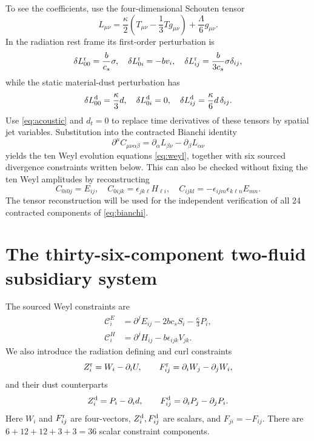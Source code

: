 \documentclass[10pt,a4paper]{article}
\newcommand{\cE}{\mathcal C^{E}}
\newcommand{\cH}{\mathcal C^{H}}
\newcommand{\kgr}{\kappa}
\begin{document}
To see the coefficients, use the four-dimensional Schouten tensor
\begin{equation}\label{eq:schouten}
L_{\mu\nu}=\frac{\kgr}{2}\left(T_{\mu\nu}-\frac13Tg_{\mu\nu}\right)+\frac\Lambda6 g_{\mu\nu}.
\end{equation}
In the radiation rest frame its first-order perturbation is
\begin{equation}\label{eq:rads}
\delta L^{\rm r}_{00}=\frac b{c_s}\sigma,\quad
\delta L^{\rm r}_{0i}=-bv_i,\quad
\delta L^{\rm r}_{ij}=\frac b{3c_s}\sigma\delta_{ij},
\end{equation}
while the static material-dust perturbation has
\begin{equation}\label{eq:dusts}
\delta L^{\rm d}_{00}=\frac{\kgr}3d,\quad
\delta L^{\rm d}_{0i}=0,\quad
\delta L^{\rm d}_{ij}=\frac{\kgr}6d\,\delta_{ij}.
\end{equation}
Use \eqref{eq:acoustic} and $d_t=0$ to replace time derivatives of these tensors by spatial jet variables. Substitution into the contracted Bianchi identity
\begin{equation}\label{eq:bianchi}
\partial^\mu C_{\mu\nu\alpha\beta}=
\partial_\alpha L_{\beta\nu}-\partial_\beta L_{\alpha\nu}
\end{equation}
yields the ten Weyl evolution equations \eqref{eq:weyl}, together with six sourced divergence constraints written below. This can also be checked without fixing the ten Weyl amplitudes by reconstructing
\begin{equation}\label{eq:reconstruct}
C_{0i0j}=E_{ij},\quad
C_{0ijk}=\epsilon_{jk\ell}H_{\ell i},\quad
C_{ijkl}=-\epsilon_{ijm}\epsilon_{k\ell n}E_{mn}.
\end{equation}
The tensor reconstruction will be used for the independent verification of all 24 contracted components of \eqref{eq:bianchi}.

\section{The thirty-six-component two-fluid subsidiary system}
The sourced Weyl constraints are
\begin{align}\label{eq:weylconstraints}
\cE_i&=\partial^jE_{ij}-2bc_s S_i-\frac{\kgr}{3}P_i,\\
\cH_i&=\partial^jH_{ij}-b\epsilon_{ijk}V_{jk}.
\end{align}
We also introduce the radiation defining and curl constraints
\begin{equation}\label{eq:radconstraints}
Z^{\rm r}_i=W_i-\partial_iU,\qquad
F^{\rm r}_{ij}=\partial_i W_j-\partial_j W_i,
\end{equation}
and their dust counterparts
\begin{equation}\label{eq:dustconstraints}
Z^{\rm d}_i=P_i-\partial_i d,\qquad
F^{\rm d}_{ij}=\partial_iP_j-\partial_jP_i.
\end{equation}
Here $W_i$ and $F^{\rm r}_{ij}$ are four-vectors, $Z^{\rm d}_i,F^{\rm d}_{ij}$ are scalars, and $F_{ji}=-F_{ij}$. There are $6+12+12+3+3=36$ scalar constraint components.
\end{document}
